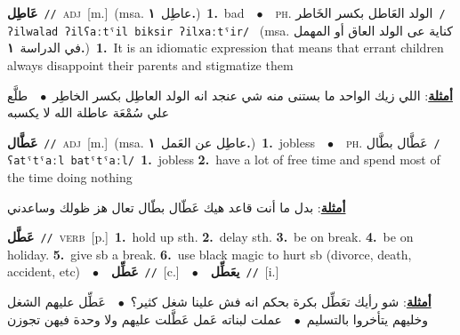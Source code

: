 \documentclass[10pt,a4paper,twoside]{article} %
\begin{document}
\begin{multicols}{2}
{\setlength\topsep{0pt}\textbf{\foreignlanguage{arabic}{عَاطِل}}\ {\color{gray}\texttt{//}\color{black}}\ \textsc{adj}\ [m.]\ \color{gray}(msa. \foreignlanguage{arabic}{عاطِل}~\foreignlanguage{arabic}{\textbf{١.}})\color{black}\ \textbf{1.}~bad\ \ $\bullet$\ \ \textsc{ph.} \color{gray} \foreignlanguage{arabic}{الولد العَاطل بكسر الخَاطر}\color{black}\ {\color{gray}\texttt{/{\sffamily ʔilwalad ʔilʕaːtˤil biksir ʔilxaːtˤir}/}\color{black}}\ \color{gray} (msa. \foreignlanguage{arabic}{كناية عى الولد العاق أو المهمل في الدراسة}~\foreignlanguage{arabic}{\textbf{١.}})\color{black}\ \textbf{1.}~It is an idiomatic expression that means that errant children always disappoint their parents and stigmatize them\  \begin{flushright}\color{gray}\foreignlanguage{arabic}{\textbf{\underline{\foreignlanguage{arabic}{أمثلة}}}: اللي زيك الواحد ما بستنى منه شي عنجد انه الولد العاطِل بكسر الخاطِر\ $\bullet$\ \  طلَّع علي سُمْعَة عاطلة الله لا يكسبه}\end{flushright}\color{black}} \vspace{2mm}

{\setlength\topsep{0pt}\textbf{\foreignlanguage{arabic}{عَطَّال}}\ {\color{gray}\texttt{//}\color{black}}\ \textsc{adj}\ [m.]\ \color{gray}(msa. \foreignlanguage{arabic}{عاطِل عن العَمل}~\foreignlanguage{arabic}{\textbf{١.}})\color{black}\ \textbf{1.}~jobless\ \ $\bullet$\ \ \textsc{ph.} \color{gray} \foreignlanguage{arabic}{عَطَّال بطَّال}\color{black}\ {\color{gray}\texttt{/{\sffamily ʕatˤtˤaːl batˤtˤaːl}/}\color{black}}\ \textbf{1.}~jobless  \textbf{2.}~have a lot of free time and spend most of the time doing nothing\  \begin{flushright}\color{gray}\foreignlanguage{arabic}{\textbf{\underline{\foreignlanguage{arabic}{أمثلة}}}: بدل ما أنت قاعد هيك عَطّال بطّال تعال هز ظولك وساعدني}\end{flushright}\color{black}} \vspace{2mm}

{\setlength\topsep{0pt}\textbf{\foreignlanguage{arabic}{عَطَّل}}\ {\color{gray}\texttt{//}\color{black}}\ \textsc{verb}\ [p.]\ \textbf{1.}~hold up sth.  \textbf{2.}~delay sth.  \textbf{3.}~be on break.  \textbf{4.}~be on holiday.  \textbf{5.}~give sb a break.  \textbf{6.}~use black magic to hurt sb (divorce, death, accident, etc)\ \ $\bullet$\ \ \setlength\topsep{0pt}\textbf{\foreignlanguage{arabic}{عَطِّل}}\ {\color{gray}\texttt{//}\color{black}}\ [c.]\ \ $\bullet$\ \ \setlength\topsep{0pt}\textbf{\foreignlanguage{arabic}{يعَطِّل}}\ {\color{gray}\texttt{//}\color{black}}\ [i.]\  \begin{flushright}\color{gray}\foreignlanguage{arabic}{\textbf{\underline{\foreignlanguage{arabic}{أمثلة}}}: شو رأيك تعَطِّل بكرة بحكم انه فش علينا شغل كثير؟\ $\bullet$\ \  عَطِّل عليهم الشغل وخليهم يتأخروا بالتسليم\ $\bullet$\ \  عملت لبناته عَمل عَطَّلت عليهم ولا وحدة فيهن تجوزن}\end{flushright}\color{black}} \vspace{2mm}


\end{multicols}
\end{document}
